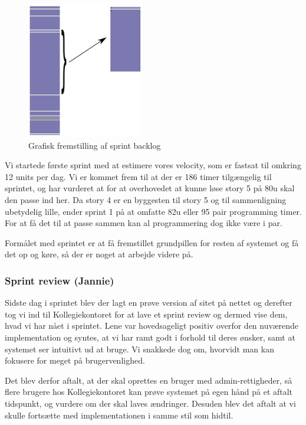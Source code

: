 \documentclass[12pt, a4paper]{report}
\begin{document}
\begin{figure}
\begin{center}
\includegraphics[width=0.45\textwidth]{sprint1log}
\end{center}
\caption{Grafisk fremstilling af sprint backlog}
\label{sprintlog1}
\end{figure}

Vi startede første sprint med at estimere vores velocity, som er fastsat til omkring 12 units per dag. Vi er kommet frem til at der er 186 timer tilgængelig til sprintet, og har vurderet at for at overhovedet at kunne løse story 5 på 80u skal den passe ind her. Da story 4 er en byggesten til story 5 og til sammenligning ubetydelig lille, ender sprint 1 på at omfatte 82u eller 95 pair programming timer. For at få det til at passe sammen kan al programmering dog ikke være i par.

Formålet med sprintet er at få fremstillet grundpillen for resten af systemet og få det op og køre, så der er noget at arbejde videre på.

\subsubsection{Sprint review (Jannie)}

Sidste dag i sprintet blev der lagt en prøve version af sitet på nettet og derefter tog vi ind til Kollegiekontoret for at lave et sprint review og dermed vise dem, hvad vi har nået i sprintet. Lene var hovedsageligt positiv overfor den nuværende implementation og syntes, at vi har ramt godt i forhold til deres ønsker, samt at systemet ser intuitivt ud at bruge. Vi snakkede dog om, hvorvidt man kan fokusere for meget på brugervenlighed.

Det blev derfor aftalt, at der skal oprettes en bruger med admin-rettigheder, så flere brugere hos Kollegiekontoret kan prøve systemet på egen hånd på et aftalt tidspunkt, og vurdere om der skal laves ændringer. Desuden blev det aftalt at vi skulle fortsætte med implementationen i samme stil som hidtil.
\end{document}
